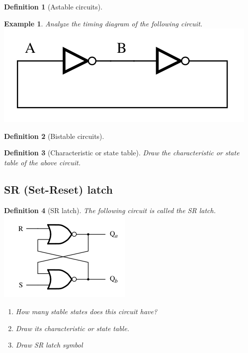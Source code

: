 \documentclass{article}
\newtheorem{example}{Example}
\newtheorem{definition}{Definition}
\begin{document}
\begin{definition}[Astable circuits]
\end{definition}
\vspace{5em}


\begin{example}
  Analyze the timing diagram of the following circuit.\\
  \includegraphics[width=0.4\linewidth]{./fig/simple-memory-element.png}
\end{example}
\vspace{10em}

\begin{definition}[Bistable circuits]
\end{definition}
\vspace{5em}

\begin{definition}[Characteristic or state table]
  Draw the characteristic or state table of the above circuit. 
\end{definition}
\vspace{10em}



\subsection{SR (Set-Reset) latch \cite[Sec~3.2.1]{harris2022digital}}

\begin{definition}[SR latch]
  The following circuit is called the SR latch. \\
  \includegraphics[width=0.3\linewidth]{./fig/fig3.3-SR-latch.png} \\
  \begin{enumerate}
    \item How many stable states does this circuit have?
    \item Draw its characteristic or state table.
    \item Draw SR latch symbol
  \end{enumerate}
\end{definition}
\vspace{20em}
\end{document}
